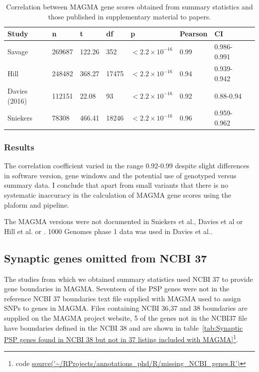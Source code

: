 \begin{table}[ht]
    \centering
    
    \begin{tabular}{llllllll}
    \toprule
        Study & n & t & df & p & Pearson & CI   \\
        \midrule
       Savage \cite{savage2018genome} & 269687 & 122.26& 352  & $<2.2 \times 10^{-16}$ & 0.99 & 0.986-0.991  \\ 
       Hill \cite{hill2019combined} & 248482 & 368.27 & 17475 & $<2.2 \times 10^{-16}$& 0.94 & 0.939-0.942 \\
       Davies (2016) \cite{davies2016genome} & 112151 & 22.08 & 93 & $<2.2 \times 10^{-16}$ & 0.92 & 0.88-0.94\\
       Sniekers \cite{sniekers2017genome}& 78308 & 466.41 & 18246 & $<2.2 \times 10^{-16}$ & 0.96 & 0.959-0.962\\
       \bottomrule
    \end{tabular}
    \caption{Correlation between MAGMA gene scores obtained from summary statistics and those published in supplementary material to papers.}
    \label{tab:Correlation between MAGMA gene scores obtained from summary statistics and those published in supplementary material to papers}
\end{table}

\subsubsection{Results}
The correlation coefficient varied in the range 0.92-0.99 despite slight differences in software version, gene windows and the potential use of genotyped versus summary data. I conclude that apart from small variants that there is no systematic inaccuracy in the calculation of MAGMA gene scores using the plaform and pipeline. 

The MAGMA versions were not documented in Sniekers et al., Davies et al or Hill et al. \cite{davies2016genome} or \cite{sniekers2017genome} \cite{hill2019combined}. 1000 Genomes phase 1 data was used in Davies et al.\cite{davies2016genome}. 

\subsection{Synaptic genes omitted from NCBI 37}
The studies from which we obtained summary statistics used NCBI 37 to provide gene boundaries in MAGMA. Seventeen of the PSP genes were not in the reference NCBI 37 boundaries text file supplied with MAGMA used to assign SNPs to genes in MAGMA. Files containing NCBI 36,37 and 38 boundaries are supplied on the MAGMA project website,  5 of the genes not in the NCBI37 file have boundaries defined in the NCBI 38 and are shown in table~\ref{tab:Synaptic PSP genes  found in NCBI 38 but not in 37 listing included with MAGMA}\footnote{code \url{source('~/RProjects/annotations_phd/R/missing_NCBI_genes.R')}}.

